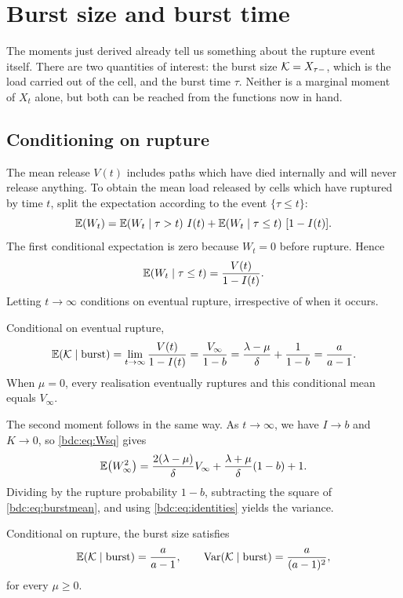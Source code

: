 \section{Burst size and burst time}
\label{bdc:sec:burst}

The moments just derived already tell us something about the rupture event
itself. There are two quantities of interest: the burst size
$\mathcal{K}=X_{\tau-}$, which is the load carried out of the cell, and the burst time
$\tau$. Neither is a marginal moment of $X_t$ alone, but both can be reached
from the functions now in hand.

\subsection{Conditioning on rupture}
\label{bdc:sec:conditioning}

The mean release $V(t)$ includes paths which have died internally and will never
release anything. To obtain the mean load released by cells which have ruptured
by time $t$, split the expectation according to the event $\{\tau\le t\}$:
\[
\mathbb{E}\!\left(W_t\right)
=\mathbb{E}\!\left(W_t\mid\tau>t\right)\,I(t)
+\mathbb{E}\!\left(W_t\mid\tau\le t\right)\,[1-I(t)].
\]
The first conditional expectation is zero because $W_t=0$ before rupture.
Hence
\[
\mathbb{E}\!\left(W_t\mid\tau\le t\right)=\frac{V(t)}{1-I(t)}.
\]
Letting $t\to\infty$ conditions on eventual rupture, irrespective of when it
occurs.

\begin{corollary}
\label{bdc:cor:burstmean}
Conditional on eventual rupture,
\begin{equation}
\label{bdc:eq:burstmean}
\mathbb{E}\!\left(\mathcal{K}\mid\text{burst}\right)
=\lim_{t\to\infty}\frac{V(t)}{1-I(t)}
=\frac{V_\infty}{1-b}
=\frac{\lambda-\mu}{\delta}+\frac{1}{1-b}
=\frac{a}{a-1}.
\end{equation}
When $\mu=0$, every realisation eventually ruptures and this conditional mean
equals $V_\infty$.
\end{corollary}

The second moment follows in the same way. As $t\to\infty$, we have $I\to b$
and $K\to0$, so \cref{bdc:eq:Wsq} gives
\[
\mathbb{E}\!\left(W_\infty^2\right)
=\frac{2(\lambda-\mu)}{\delta}V_\infty
+\frac{\lambda+\mu}{\delta}(1-b)+1.
\]
Dividing by the rupture probability $1-b$, subtracting the square of
\cref{bdc:eq:burstmean}, and using \cref{bdc:eq:identities} yields the variance.

\begin{corollary}
\label{bdc:cor:burstvar}
Conditional on rupture, the burst size satisfies
\begin{equation}
\label{bdc:eq:burstvar}
\mathbb{E}\!\left(\mathcal{K}\mid\text{burst}\right)=\frac{a}{a-1},
\qquad
\operatorname{Var}\!\left(\mathcal{K}\mid\text{burst}\right)=\frac{a}{(a-1)^2},
\end{equation}
for every $\mu\ge0$.
\end{corollary}

